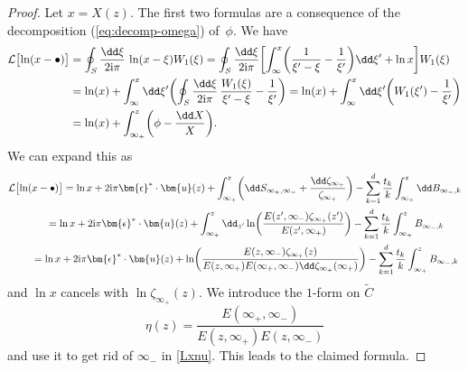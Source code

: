 \documentclass[10pt,a4paper]{amsart}
\numberwithin{equation}{section}
\begin{document}
\begin{proof}
 Let $x = X(z)$. The first two formulas are a consequence of the decomposition (\ref{eq:decomp-omega})
 of~$\phi$. We have
 \begin{align*}
 \mathcal{L}\bigl[\ln(x - \bullet)\bigr]
 &= \oint_{S} \frac{\dd\xi}{2{\rm i}\pi}\,\ln(x - \xi)W_{1}(\xi)
  = \oint_{S} \frac{\dd \xi}{2{\rm i}\pi} \biggl[\int_{\infty}^{x}\biggl(\frac{1}{\xi' - \xi} - \frac{1}{\xi'}\biggr) \dd \xi' + \ln x \biggr]W_{1}(\xi)\\
 &= \ln(x) + \int_{\infty}^{x} \dd \xi' \biggl(\oint_{S} \frac{\dd \xi}{2{\rm i}\pi}\,\frac{W_1(\xi)}{\xi' - \xi} - \frac{1}{\xi'}\biggr)
  = \ln(x) + \int_{\infty}^{x} \dd \xi'\biggl(W_{1}(\xi') - \frac{1}{\xi'}\biggr)\\
 &= \ln(x) + \int_{\infty_{+}}^{z}\biggl(\phi - \frac{\dd X}{X}\biggr).
 \end{align*}
 We can expand this as
 \begin{gather}
 \mathcal{L}\bigl[\ln(x - \bullet)\bigr]
  = \ln x + 2{\rm i}\pi \bm{\epsilon}^* \cdot \bm{u}(z) + \int_{\infty_+}^{z} \biggl(\dd S_{\infty_+,\infty_-} + \frac{\dd \zeta_{\infty_+}}{\zeta_{\infty_+}}\biggr) - \sum_{k = 1}^{d} \frac{t_k}{k} \int_{\infty_+}^{z} \dd B_{\infty_-,k} \nonumber\\
 \qquad{} = \ln x + 2{\rm i}\pi \bm{\epsilon}^* \cdot \bm{u}(z) + \int_{\infty_+}^z \dd_{z'} \ln\biggl(\frac{E(z',\infty_-)\zeta_{\infty_+}(z')}{E(z',\infty_+)}\biggr) - \sum_{k = 1}^{d} \frac{t_k}{k} \int_{\infty_+}^{z} B_{\infty_-,k}\label{Lxnu}\\
 \qquad{} = \ln x + 2{\rm i}\pi \bm{\epsilon}^* \cdot \bm{u}(z) + \ln\biggl(\frac{E(z,\infty_-)\zeta_{\infty_+}(z)}{E(z,\infty_+)E(\infty_+,\infty_-)\dd \zeta_{\infty_+}(\infty_+)}\biggr) - \sum_{k = 1}^{d} \frac{t_k}{k} \int_{\infty_+}^{z} B_{\infty_-,k}\nonumber
 \end{gather}
and $\ln x$ cancels with $\ln \zeta_{\infty_+}(z)$. We introduce the $1$-form on $\widetilde{C}$
\begin{equation}
\label{etadef}\eta(z) = \frac{E(\infty_+,\infty_-)}{E(z,\infty_+)E(z,\infty_-)}
\end{equation}
and use it to get rid of $\infty_-$ in \eqref{Lxnu}. This leads to the claimed formula.


\end{proof}
\end{document}
